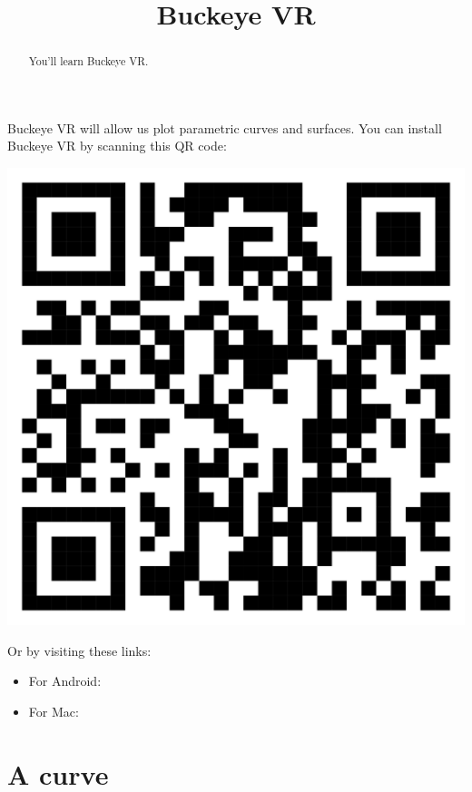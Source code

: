 \documentclass{ximera}
\title{Buckeye VR}
\begin{document}
\begin{abstract}
  You'll learn Buckeye VR.
\end{abstract}
\maketitle

Buckeye VR will allow us plot parametric curves and surfaces.
You can install Buckeye VR by scanning this QR code:
\begin{image}
  \includegraphics{QRBVRPlot.png}
\end{image}

Or by visiting these links:
\begin{itemize}
\item For Android: 
\item For Mac: 
\end{itemize}



\section{A curve}
\end{document}
